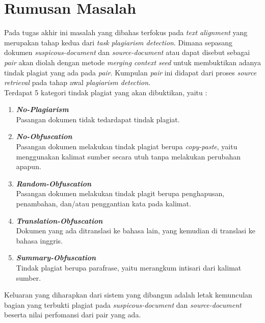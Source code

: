 \documentclass[../Book, Implementasi Algoritma Merging Context Seeds untuk Plagiarism Detection.tex]{subfiles}
\begin{document}
	\section{Rumusan Masalah}

	\noindent Pada tugas akhir ini masalah yang dibahas terfokus pada \textit{text alignment} yang merupakan tahap kedua dari \textit{task} \textit{plagiarism detection}. Dimana sepasang dokumen \textit{suspicous-document} dan \textit{source-document} atau dapat disebut sebagai \textit{pair} akan diolah dengan metode \textit{merging context seed} untuk membuktikan adanya tindak plagiat yang ada pada \textit{pair}. Kumpulan \textit{pair} ini didapat dari proses \textit{source retrieval} pada tahap awal \textit{plagiarism detection}. \\

	\noindent Terdapat 5 kategori tindak plagiat yang akan dibuktikan, yaitu :

	\begin{enumerate}
		\item \textit{\textbf{No-Plagiarism}} \\
		Pasangan dokumen tidak tedardapat tindak plagiat.
		\item \textit{\textbf{No-Obfuscation}} \\
		Pasangan dokumen melakukan tindak plagiat berupa \textit{copy-paste}, yaitu menggunakan kalimat sumber secara utuh tanpa melakukan perubahan apapun.
		\item \textit{\textbf{Random-Obfuscation}} \\
		Pasangan dokumen melakukan tindak plagit berupa penghapusan, penambahan, dan/atau penggantian kata pada kalimat. 
		\item \textit{\textbf{Translation-Obfuscation}} \\
		Dokumen yang ada ditranslasi ke bahasa lain, yang kemudian di translasi ke bahasa inggris.
		\item \textit{\textbf{Summary-Obfuscation}}\\
		Tindak plagiat berupa parafrase, yaitu merangkum intisari dari kalimat sumber.
	\end{enumerate}
	
	\noindent Keluaran yang diharapkan dari sistem yang dibangun adalah letak kemunculan bagian yang terbukti plagiat pada \textit{suspicous-document} dan \textit{source-document} beserta nilai perfomansi dari pair yang ada.
\end{document}
